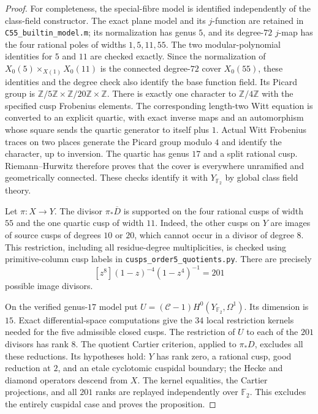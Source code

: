 \begin{proof}
For completeness, the special-fibre model is identified independently
of the class-field constructor. The exact plane model and its
$j$-function are retained in \texttt{C55\_builtin\_model.m}; its
normalization has genus $5$, and its degree-$72$ $j$-map has the four
rational poles of widths $1,5,11,55$. The two modular-polynomial
identities for $5$ and $11$ are checked exactly. Since the normalization
of $X_0(5)\times_{X(1)}X_0(11)$ is the connected degree-$72$ cover
$X_0(55)$, these identities and the degree check also identify the
base function field. Its Picard group is
$\mathbb Z/5\mathbb Z\times\mathbb Z/20\mathbb Z\times\mathbb Z$.
There is exactly one character to $\mathbb Z/4\mathbb Z$ with the
specified cusp Frobenius elements. The corresponding length-two Witt
equation is converted to an explicit quartic, with exact inverse
maps and an automorphism whose square sends the quartic generator
to itself plus $1$. Actual Witt Frobenius traces on two places
generate the Picard group modulo $4$ and identify the character,
up to inversion. The quartic has genus $17$ and a split rational
cusp. Riemann--Hurwitz therefore proves that the cover is everywhere
unramified and geometrically connected. These checks identify it
with $Y_{\mathbb F_2}$ by global class field theory.

Let $\pi:X\longrightarrow Y$. The divisor $\pi_*\overline D$ is
supported on the four rational cusps of width $55$ and the one
quartic cusp of width $11$. Indeed, the other cusps on $Y$ are images
of source cusps of degrees $10$ or $20$, which cannot occur in a
divisor of degree $8$. This restriction, including all residue-degree
multiplicities, is checked using primitive-column cusp labels in
\texttt{cusps\_order5\_quotients.py}. There are precisely
\[
 [z^8](1-z)^{-4}(1-z^4)^{-1}=201
\]
possible image divisors.

On the verified genus-$17$ model put
$U=(\mathcal C-1)H^0(Y_{\mathbb F_2},\Omega^1)$.
Its dimension is $15$. Exact differential-space computations give
the $34$ local restriction kernels needed for the five admissible
closed cusps. The restriction of $U$ to each of the $201$ divisors
has rank $8$. The quotient Cartier criterion, applied to
$\pi_*D$, excludes all these reductions. Its hypotheses hold:
$Y$ has rank zero, a rational cusp, good reduction at $2$, and an
etale cyclotomic cuspidal boundary; the Hecke and diamond operators
descend from $X$. The kernel equalities, the Cartier projections,
and all $201$ ranks are replayed independently over $\mathbb F_2$.
This excludes the entirely cuspidal case and proves the proposition.
\end{proof}
